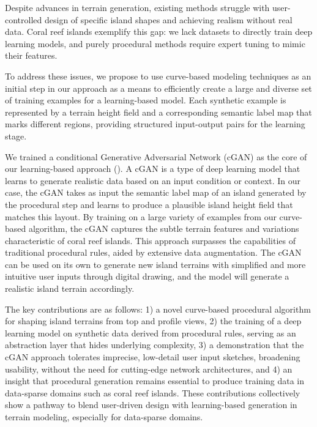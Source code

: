 Despite advances in terrain generation, existing methods struggle with user-controlled design of specific island shapes and achieving realism without real data. Coral reef islands exemplify this gap: we lack datasets to directly train deep learning models, and purely procedural methods require expert tuning to mimic their features.

To address these issues, we propose to use curve-based modeling techniques as an initial step in our approach as a means to efficiently create a large and diverse set of training examples for a learning-based model. Each synthetic example is represented by a terrain height field and a corresponding semantic label map that marks different regions, providing structured input-output pairs for the learning stage.

We trained a conditional Generative Adversarial Network (cGAN) as the core of our learning-based approach (\cite{Mirza2014,Isola2017}). A cGAN is a type of deep learning model that learns to generate realistic data based on an input condition or context. In our case, the cGAN takes as input the semantic label map of an island generated by the procedural step and learns to produce a plausible island height field that matches this layout. By training on a large variety of examples from our curve-based algorithm, the cGAN captures the subtle terrain features and variations characteristic of coral reef islands. This approach surpasses the capabilities of traditional procedural rules, aided by extensive data augmentation. The cGAN can be used on its own to generate new island terrains with simplified and more intuitive user inputs through digital drawing, and the model will generate a realistic island terrain accordingly.

The key contributions are as follows: 1) a novel curve-based procedural algorithm for shaping island terrains from top and profile views, 2) the training of a deep learning model on synthetic data derived from procedural rules, serving as an abstraction layer that hides underlying complexity, 3) a demonstration that the cGAN approach tolerates imprecise, low-detail user input sketches, broadening usability, without the need for cutting-edge network architectures, and 4) an insight that procedural generation remains essential to produce training data in data-sparse domains such as coral reef islands. 
These contributions collectively show a pathway to blend user-driven design with learning-based generation in terrain modeling, especially for data-sparse domains.
